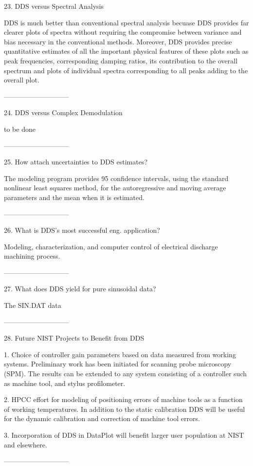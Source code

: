 23. DDS versus Spectral Analysis
 
DDS is much better than conventional spectral
analysis becuase DDS provides far clearer plots of
spectra without requiring the compromise between
variance and bias necessary in the conventional
methods.  Moreover, DDS provides precise
quantitative estimates of all the important
physical features of these plots such as peak
frequencies, corresponding damping ratios, its
contribution to the overall spectrum and plots of
individual spectra corresponding to all peaks
adding to the overall plot.
 
-----------------------------
 
24. DDS versus Complex Demodulation
 
to be done
 
-----------------------------
 
25. How attach uncertainties to DDS estimates?
 
The modeling program provides 95 confidence
intervals, using the standard nonlinear least
squares method, for the autoregressive and moving
average parameters and the mean when it is
estimated.
 
-----------------------------
 
26. What is DDS's most successful eng. application?
 
Modeling, characterization, and computer control
of electrical discharge machining process.
 
-----------------------------
 
27. What does DDS yield for pure sinusoidal data?
 
The SIN.DAT data
 
-----------------------------
 
28. Future NIST Projects to Benefit from DDS
 
  1. Choice of controller gain parameters based on data measured from working
     systems. Preliminary work has been initiated for scanning probe microscopy
      (SPM). The results can be extended to any system consisting of a controller
      such as machine tool, and stylus profilometer.
 
  2. HPCC effort for modeling of positioning errors of machine tools as a
     function of working temperatures. In addition to the static calibration
     DDS will be useful for the dynamic calibration and correction of machine
     tool errors.
 
  3. Incorporation of DDS in DataPlot will benefit larger user population
     at NIST and elsewhere.
 
-----------------------------
